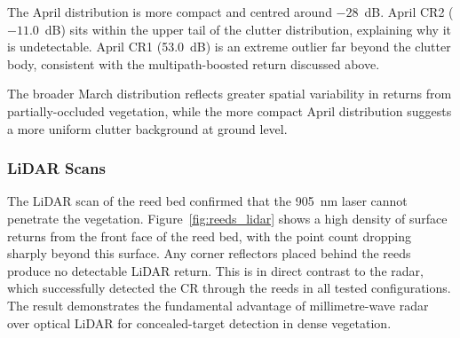 The April distribution is more compact and centred around $-28$~dB.
April CR2 ($-11.0$~dB) sits within the upper tail of the clutter distribution,
explaining why it is undetectable.
April CR1 (53.0~dB) is an extreme outlier far beyond the clutter body,
consistent with the multipath-boosted return discussed above.

The broader March distribution reflects greater spatial variability in returns
from partially-occluded vegetation, while the more compact April distribution
suggests a more uniform clutter background at ground level.

\subsubsection*{LiDAR Scans}

The LiDAR scan of the reed bed confirmed that the 905~nm laser cannot
penetrate the vegetation.
Figure~\ref{fig:reeds_lidar} shows a high density of surface returns from
the front face of the reed bed, with the point count dropping sharply beyond
this surface.
Any corner reflectors placed behind the reeds produce no detectable LiDAR
return.
This is in direct contrast to the radar, which successfully detected the CR
through the reeds in all tested configurations.
The result demonstrates the fundamental advantage of millimetre-wave radar
over optical LiDAR for concealed-target detection in dense vegetation.
